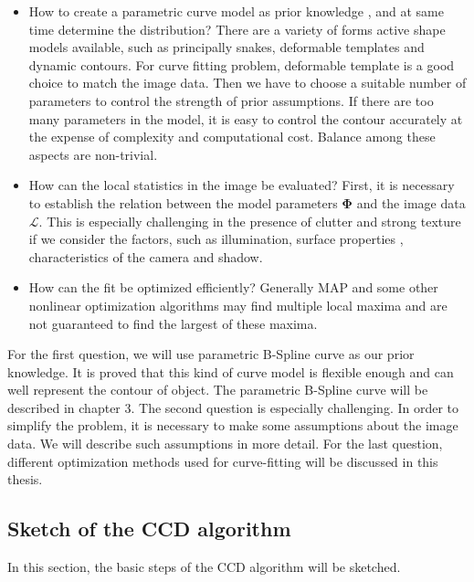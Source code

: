 \begin{itemize}
\item How to create a parametric curve model as prior knowledge , and
  at same time determine the distribution? There are a variety of
  forms active shape models available, such as principally snakes,
  deformable templates and dynamic contours. For curve fitting
  problem, deformable template is a good choice to match the image
  data. Then we have to choose a suitable number of parameters to control
  the strength of prior assumptions. If there are too many parameters
  in the model, it is easy to control the contour accurately at the
  expense of complexity and computational cost. Balance among these
  aspects are non-trivial.

\item How can the local statistics in the image be evaluated? First, it
  is necessary to establish the relation between the model parameters
  $\mathbf{\Phi}$ and the image data $\mathcal{L}$. This is especially
challenging in the presence of clutter and strong texture if we
consider the factors, such as  illumination, surface properties ,
characteristics of the camera and shadow. 

\item How can the fit be optimized efficiently? Generally MAP and some
  other nonlinear optimization algorithms may find multiple local maxima and are not guaranteed to find the
  largest of these maxima.
\end{itemize}


For the first question, we will use parametric B-Spline curve as
our prior knowledge. It is proved that this kind of curve model is
flexible enough and can well represent the contour of object. The
parametric B-Spline curve will be described in chapter 3.
The second question is especially challenging. In order to simplify
the problem, it is necessary to make some assumptions about the image
data. We will describe such assumptions in more detail. For the last
question, different optimization methods used for curve-fitting will
be discussed in this thesis.

\subsection{Sketch of the CCD algorithm}
\label{sec:sccd}

In this section, the basic steps of the CCD algorithm will be sketched.

